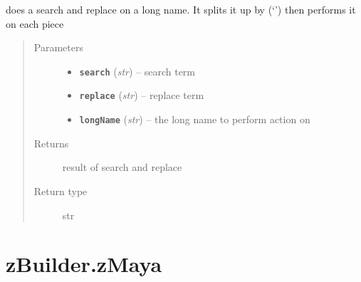 \documentclass[letterpaper,10pt,english]{sphinxmanual}
\begin{document}
\begin{fulllineitems}
\label{zBuilder.nodes:zBuilder.nodes.zTet.replace_longname}
does a search and replace on a long name.  It splits it up by (`\textbar{}') then
performs it on each piece
\begin{quote}\begin{description}
\item[{Parameters}] \leavevmode\begin{itemize}
\item {} 
\textbf{\texttt{search}} (\emph{str}) -- search term

\item {} 
\textbf{\texttt{replace}} (\emph{str}) -- replace term

\item {} 
\textbf{\texttt{longName}} (\emph{str}) -- the long name to perform action on

\end{itemize}

\item[{Returns}] \leavevmode
result of search and replace

\item[{Return type}] \leavevmode
str

\end{description}\end{quote}

\end{fulllineitems}



\section{zBuilder.zMaya}
\label{zBuilder:zbuilder-zmaya}\label{zBuilder:module-zBuilder.zMaya}

\begin{fulllineitems}
\label{zBuilder:zBuilder.zMaya.clean_scene}
\end{fulllineitems}


\begin{fulllineitems}
\label{zBuilder:zBuilder.zMaya.create_zBone}
\end{fulllineitems}
\end{document}
